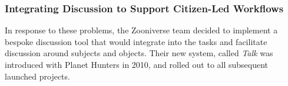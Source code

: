 \documentclass{sigchi}
\begin{document}




\subsubsection{Integrating Discussion to Support Citizen-Led Workflows}

In response to these problems, the Zooniverse team decided to implement a bespoke discussion tool that would integrate into the tasks and facilitate discussion around subjects and objects. Their new system, called \emph{Talk} was introduced with Planet Hunters in 2010, and rolled out to all subsequent launched projects.  
\end{document}
